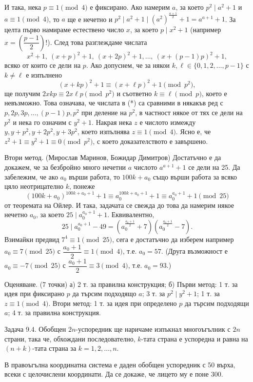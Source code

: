 И така, нека $p\equiv1\pmod4$ е фиксирано. Ако намерим $a$, за което $p^2\mid a^2+1$ и $a\equiv1\pmod4$, то $a$ ще е нечетно и $p^2\mid a^2+1\mid(a^2)^{\frac{a+1}{2}}+1=a^{a+1}+1$. За целта първо намираме естествено число $x$, за което $p\mid x^2+1$ (например $x=\left(\dfrac{p-1}{2}\right)!$). След това разглеждаме числата
$$
x^2+1,\ (x+p)^2+1,\ (x+2p)^2+1,\ldots,\ (x+(p-1)p)^2+1, \tag{*}
$$
всяко от които се дели на $p$. Ако допуснем, че за някои $k,\ell\in\{0,1,2,\ldots,p-1\}$ с $k\neq\ell$ е изпълнено
$$
(x+kp)^2+1\equiv(x+\ell p)^2+1\pmod{p^2},
$$
ще получим $2xkp\equiv2x\ell p\pmod{p^2}$ и съответно $k\equiv\ell\pmod p$, което е невъзможно. Това означава, че числата в (*) са сравними в някакъв ред с $p,2p,3p,\ldots,(p-1)p,p^2$ при деление на $p^2$, в частност някое от тях се дели на $p^2$ и нека го означим с $y^2+1$. Накрая нека $z$ е числото измежду $y,y+p^2,y+2p^2,y+3p^2$, което изпълнява $z\equiv1\pmod4$. Ясно е, че $z^2+1\equiv y^2+1\equiv0\pmod{p^2}$, с което доказателството е завършено.

Втори метод. (Мирослав Маринов, Божидар Димитров) Достатъчно е да докажем, че за безбройно много нечетни $a$ числото $a^{a+1}+1$ се дели на 25. Да забележим, че ако $a_0$ върши работа, то $100k+a_0$ също върши работа за всяко цяло неотрицателно $k$, понеже
$$
(100k+a_0)^{100k+a_0+1}+1\equiv a_0^{100k+a_0+1}+1\equiv a_0^{a_0+1}+1\pmod{25}
$$
от теоремата на Ойлер. И така, задачата се свежда до това да намерим някое нечетно $a_0$, за което $25\mid a_0^{a_0+1}+1$. Еквивалентно,
$$
25\mid a_0^{a_0+1}-49=\left(a_0^{\frac{a_0+1}{2}}+7\right)\left(a_0^{\frac{a_0+1}{2}}-7\right).
$$
Взимайки предвид $7^4\equiv1\pmod{25}$, сега е достатъчно да изберем например $a_0\equiv7\pmod{25}$ с $\dfrac{a_0+1}{2}\equiv1\pmod4$, т.е. $a_0=57$. (Друга възможност е $a_0\equiv-7\pmod{25}$ с $\dfrac{a_0+1}{2}\equiv3\pmod4$, т.е. $a_0=93$.)

Оценяване. (7 точки) а) 2 т. за правилна конструкция; б) Първи метод: 1 т. за идея при фиксирано $p$ да търсим подходящо $a$; 3 т. за $p^2\mid y^2+1$; 1 т. за $z\equiv1\pmod4$. Втори метод: 1 т. за идея при определено $p$ да търсим подходящи $a$; 4 т. за правилна конструкция.

Задача 9.4. Обобщен $2n$-успоредник ще наричаме изпъкнал многоъгълник с $2n$ страни, така че, обхождани последователно, $k$-тата страна е успоредна и равна на $(n+k)$-тата страна за $k=1,2,\ldots,n$.

В правоъгълна координатна система е даден обобщен успоредник с 50 върха, всеки с целочислени координати. Да се докаже, че лицето му е поне 300.

